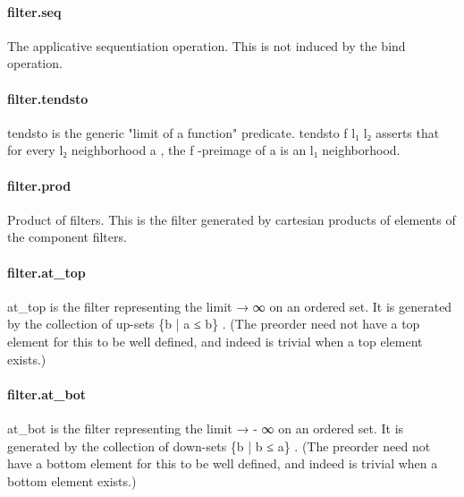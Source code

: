 \documentclass{article}
\begin{document}
\paragraph{filter.seq}
\par
The applicative sequentiation operation. This is not induced by the bind operation.
\paragraph{filter.tendsto}
\par
\colorbox[RGB]{253,246,227}{{{{\color[RGB]{101, 123, 131} tendsto }}}} is the generic "limit of a function" predicate.
\colorbox[RGB]{253,246,227}{{{{\color[RGB]{101, 123, 131} tendsto f l₁ l₂ }}}} asserts that for every 
\colorbox[RGB]{253,246,227}{{{{\color[RGB]{101, 123, 131} l₂ }}}} neighborhood 
\colorbox[RGB]{253,246,227}{{{{\color[RGB]{101, 123, 131} a }}}},
the 
\colorbox[RGB]{253,246,227}{{{{\color[RGB]{101, 123, 131} f }}}}-preimage of 
\colorbox[RGB]{253,246,227}{{{{\color[RGB]{101, 123, 131} a }}}} is an 
\colorbox[RGB]{253,246,227}{{{{\color[RGB]{101, 123, 131} l₁ }}}} neighborhood.
\paragraph{filter.prod}
\par
Product of filters. This is the filter generated by cartesian products
of elements of the component filters.
\paragraph{filter.at\_top}
\par
\colorbox[RGB]{253,246,227}{{{{\color[RGB]{101, 123, 131} at\_top }}}} is the filter representing the limit 
\colorbox[RGB]{253,246,227}{{{{\color[RGB]{101, 123, 131} → ∞ }}}} on an ordered set.
It is generated by the collection of up-sets 
\colorbox[RGB]{253,246,227}{{{{\color[RGB]{101, 123, 131} \{b | a  }}}{{{\color[RGB]{181, 137, 0} ≤ }}}{{{\color[RGB]{101, 123, 131}  b\} }}}}.
(The preorder need not have a top element for this to be well defined,
and indeed is trivial when a top element exists.)
\paragraph{filter.at\_bot}
\par
\colorbox[RGB]{253,246,227}{{{{\color[RGB]{101, 123, 131} at\_bot }}}} is the filter representing the limit 
\colorbox[RGB]{253,246,227}{{{{\color[RGB]{101, 123, 131} →  }}}{{{\color[RGB]{181, 137, 0} - }}}{{{\color[RGB]{101, 123, 131} ∞ }}}} on an ordered set.
It is generated by the collection of down-sets 
\colorbox[RGB]{253,246,227}{{{{\color[RGB]{101, 123, 131} \{b | b  }}}{{{\color[RGB]{181, 137, 0} ≤ }}}{{{\color[RGB]{101, 123, 131}  a\} }}}}.
(The preorder need not have a bottom element for this to be well defined,
and indeed is trivial when a bottom element exists.)
\end{document}
